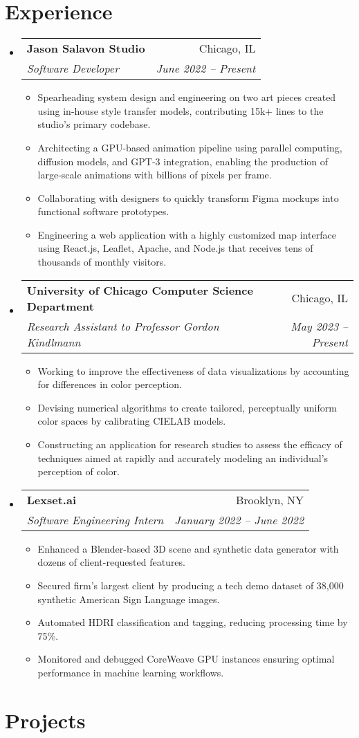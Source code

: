 \documentclass[letterpaper,11pt]{article}
\makeatletter
\newcommand{\resumeItem}[1]{
  \item\small{
    {#1 \vspace{-2pt}}
  }
}
\newcommand{\resumeSubheading}[4]{
  \vspace{-2pt}\item
    \begin{tabular*}{0.97\textwidth}[t]{l@{\extracolsep{\fill}}r}
      \textbf{#1} & #2 \\
      \textit{\small#3} & \textit{\small #4} \\
    \end{tabular*}\vspace{-7pt}
}
\newcommand{\resumeSubHeadingListStart}{\begin{itemize}[leftmargin=0.125in, label={}]}
\newcommand{\resumeSubHeadingListEnd}{\end{itemize}}
\newcommand{\resumeItemListStart}{\begin{itemize}[leftmargin=0.185in]
}
\newcommand{\resumeItemListEnd}{\end{itemize}\vspace{-5pt}}
\makeatother
\begin{document}
\section{Experience}
  \resumeSubHeadingListStart
    \resumeSubheading
      {Jason Salavon Studio}
      {Chicago, IL}
      {Software Developer}
      {June 2022 -- Present}
      \resumeItemListStart
        \resumeItem{Spearheading system design and engineering on two art pieces created using in-house style transfer models, contributing 15k+ lines to the studio's primary codebase.}
        \resumeItem{Architecting a GPU-based animation pipeline using parallel computing, diffusion models, and GPT-3 integration, enabling the production of large-scale animations with billions of pixels per frame.}
        \resumeItem{Collaborating with designers to quickly transform Figma mockups into functional software prototypes.}
        \resumeItem{Engineering a web application with a highly customized map interface using React.js, Leaflet, Apache, and Node.js that receives tens of thousands of  monthly visitors.}
      \resumeItemListEnd
    \resumeSubheading
      {University of Chicago Computer Science Department}
      {Chicago, IL}
      {Research Assistant to Professor Gordon Kindlmann}
      {May 2023 -- Present}
      \resumeItemListStart
        \resumeItem{Working to improve the effectiveness of data visualizations by accounting for differences in color perception.}
        \resumeItem{Devising numerical algorithms to create tailored, perceptually uniform color spaces by calibrating CIELAB models.}\resumeItem{Constructing an application for research studies to assess the efficacy of techniques aimed at rapidly and accurately modeling an individual's  perception of color.}
      \resumeItemListEnd
    \resumeSubheading
      {Lexset.ai}
      {Brooklyn, NY}
      {Software Engineering Intern}
      {January 2022 -- June 2022}
      \resumeItemListStart
        \resumeItem{Enhanced a Blender-based 3D scene and synthetic data generator with dozens of client-requested features.}
        \resumeItem{Secured firm's largest client by producing a tech demo dataset of 38,000 synthetic American Sign Language images.}\resumeItem{Automated HDRI classification and tagging, reducing processing time by 75\%.}
        \resumeItem{Monitored and debugged CoreWeave GPU instances ensuring optimal performance in machine learning workflows. }
      \resumeItemListEnd
  \resumeSubHeadingListEnd

\section{Projects}
\end{document}
